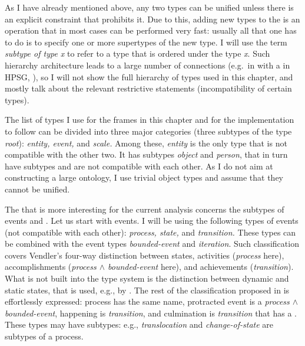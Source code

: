 As I have already mentioned above, any two types can be unified unless there is an explicit constraint that prohibits it. Due to this, adding new types to the  is an operation that in most cases can be performed very fast: usually all that one has to do is to specify one or more supertypes of the new type. I will use the term \textit{subtype of type x} to refer to a type that is ordered under the type \textit{x}. Such hierarchy architecture leads to a large number of connections (e.g.\ in  with a  in HPSG, \citealt{PollardSag:94}), so I will not show the full hierarchy of types used in this chapter, and mostly talk about the relevant restrictive statements (incompatibility of certain types).

The list of types I use for the frames in this chapter and for the implementation to follow can be divided into three major categories (three subtypes of the type \textit{root}): \textit{entity, event,} and \textit{scale.} Among these, \textit{entity} is the only type that is not compatible with the other two. It has subtypes \textit{object} and \textit{person}, that in turn have subtypes and are not compatible with each other. As I do not aim at constructing a large ontology, I use trivial object types and assume that they cannot be unified.

The  that is more interesting for the current analysis concerns the subtypes of events and . Let us start with events. I will be using the following types of events (not compatible with each other): \textit{process, state,} and \textit{transition.} These types can be combined with the event types \textit{bounded-event} and \textit{iteration}. Such classification covers Vendler's \citep{Vendler:67} four-way distinction between states, activities (\textit{process} here), accomplishments (\textit{process $\wedge$ bounded-event} here), and achievements (\textit{transition}). What is not built into the type system is the distinction between dynamic and static states, that is used, e.g., by \citet{Bach:86}. The rest of the classification proposed in \citealt{Bach:86} is effortlessly expressed: process has the same name, protracted event is a \textit{process $\wedge$ bounded-event}, happening is \textit{transition}, and culmination is \textit{transition} that has a . These types may have subtypes: e.g., \textit{translocation} and \textit{change-of-state} are subtypes of a process.

